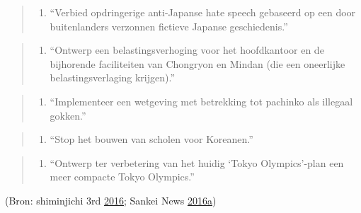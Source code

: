 \documentclass[10.5pt,dutch,]{article}
\providecommand{\tightlist}{%
  \setlength{\itemsep}{0pt}\setlength{\parskip}{0pt}}
\begin{document}
\begin{quote}
\begin{enumerate}
\def\labelenumi{\arabic{enumi}.}
\setcounter{enumi}{2}
\tightlist
\item
  ``Verbied opdringerige anti-Japanse hate speech gebaseerd op een door
  buitenlanders verzonnen fictieve Japanse geschiedenis.''
\end{enumerate}
\end{quote}

\begin{quote}
\begin{enumerate}
\def\labelenumi{\arabic{enumi}.}
\setcounter{enumi}{3}
\tightlist
\item
  ``Ontwerp een belastingsverhoging voor het hoofdkantoor en de
  bijhorende faciliteiten van Chongryon en Mindan (die een oneerlijke
  belastingsverlaging krijgen).''
\end{enumerate}
\end{quote}

\begin{quote}
\begin{enumerate}
\def\labelenumi{\arabic{enumi}.}
\setcounter{enumi}{4}
\tightlist
\item
  ``Implementeer een wetgeving met betrekking tot pachinko als illegaal
  gokken.''
\end{enumerate}
\end{quote}

\begin{quote}
\begin{enumerate}
\def\labelenumi{\arabic{enumi}.}
\setcounter{enumi}{5}
\tightlist
\item
  ``Stop het bouwen van scholen voor Koreanen.''
\end{enumerate}
\end{quote}

\begin{quote}
\begin{enumerate}
\def\labelenumi{\arabic{enumi}.}
\setcounter{enumi}{6}
\tightlist
\item
  ``Ontwerp ter verbetering van het huidig `Tokyo Olympics'-plan een
  meer compacte Tokyo Olympics.''
\end{enumerate}
\end{quote}

(Bron: shiminjichi 3rd
\protect\hyperlink{ref-shiminjichiux5f3rdux5ftokyochijiux5f2016}{2016};
Sankei News
\protect\hyperlink{ref-sankeiux5fnewsux5ftokyochiji-senux5f2016}{2016}\protect\hyperlink{ref-sankeiux5fnewsux5ftokyochiji-senux5f2016}{a})
\end{document}
